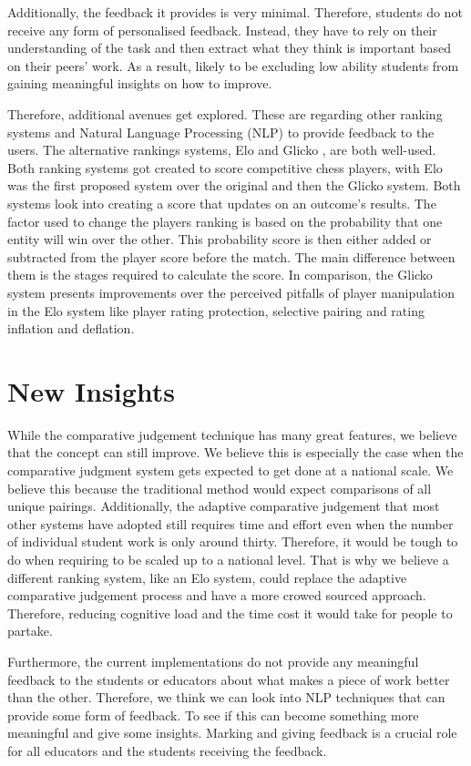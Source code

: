 	Additionally, the feedback it provides is very minimal. Therefore, students do not receive any form of personalised feedback. Instead, they have to rely on their understanding of the task and then extract what they think is important based on their peers' work. As a result, likely to be excluding low ability students from gaining meaningful insights on how to improve.
	
	Therefore, additional avenues get explored. These are regarding other ranking systems and Natural Language Processing (NLP) to provide feedback to the users. The alternative rankings systems, Elo and Glicko \cite{elo1978rating, glickman1995glicko, glickman2012example}, are both well-used. Both ranking systems got created to score competitive chess players, with Elo was the first proposed system over the original and then the Glicko system. Both systems look into creating a score that updates on an outcome's results. The factor used to change the players ranking is based on the probability that one entity will win over the other. This probability score is then either added or subtracted from the player score before the match. The main difference between them is the stages required to calculate the score. In comparison, the Glicko system presents improvements over the perceived pitfalls of player manipulation in the Elo system like player rating protection, selective pairing and rating inflation and deflation.
	
	\section{New Insights}
	While the comparative judgement technique has many great features, we believe that the concept can still improve. We believe this is especially the case when the comparative judgment system gets expected to get done at a national scale. We believe this because the traditional method would expect comparisons of all unique pairings. Additionally, the adaptive comparative judgement that most other systems have adopted still requires time and effort even when the number of individual student work is only around thirty. Therefore, it would be tough to do when requiring to be scaled up to a national level. That is why we believe a different ranking system, like an Elo system, could replace the adaptive comparative judgement process and have a more crowed sourced approach. Therefore, reducing cognitive load and the time cost it would take for people to partake. 
	
	Furthermore, the current implementations do not provide any meaningful feedback to the students or educators about what makes a piece of work better than the other. Therefore, we think we can look into NLP techniques that can provide some form of feedback. To see if this can become something more meaningful and give some insights. Marking and giving feedback is a crucial role for all educators and the students receiving the feedback.


